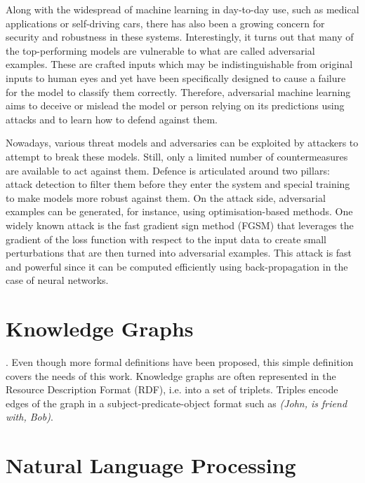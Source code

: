 Along with the widespread of machine learning in day-to-day use, such as medical applications or self-driving cars, there has also been a growing concern for security and robustness in these systems. Interestingly, it turns out that many of the top-performing models are vulnerable to what are called adversarial examples. These are crafted inputs which may be indistinguishable from original inputs to human eyes and yet have been specifically designed to cause a failure for the model to classify them correctly.
Therefore, adversarial machine learning aims to deceive or mislead the model or person relying on its predictions using attacks and to learn how to defend against them. 

Nowadays, various threat models and adversaries can be exploited by attackers to attempt to break these models. Still, only a limited number of countermeasures are available to act against them. Defence is articulated around two pillars: attack detection to filter them before they enter the system and special training to make models more robust against them. On the attack side, adversarial examples can be generated, for instance, using optimisation-based methods. One widely known attack is the fast gradient sign method (FGSM)\cite{FGSM} that leverages the gradient of the loss function with respect to the input data to create small perturbations that are then turned into adversarial examples. This attack is fast and powerful since it can be computed efficiently using back-propagation in the case of neural networks.

\section{Knowledge Graphs}
. Even though more formal definitions have been proposed\cite{KnowledgeGraphDefFormal}, this simple definition covers the needs of this work. Knowledge graphs are often represented in the Resource Description Format (RDF), i.e. into a set of triplets. Triples encode edges of the graph in a subject-predicate-object format such as \textit{(John, is friend with, Bob)}. 


\section{Natural Language Processing}

